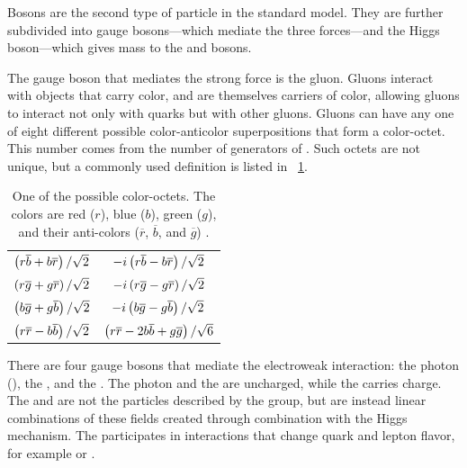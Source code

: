 Bosons are the second type of particle in the standard model. They are further
subdivided into gauge bosons---which mediate the three forces---and the Higgs
boson---which gives mass to the \W and \Z bosons.

The gauge boson that mediates the strong force is the gluon. Gluons interact
with objects that carry color, and are themselves carriers of color, allowing
gluons to interact not only with quarks but with other gluons. Gluons can have
any one of eight different possible color-anticolor superpositions that form a
color-octet. This number comes from the number of generators of \SUthree. Such
octets are not unique, but a commonly used definition is listed in
\TAB~\ref{table:gluon_color}.

\begin{table}[h]
\centering
{}
\begin{center}
    \begin{tabular}{c  c}
        $\left( r \overline{b} + b \overline{r} \right) / \sqrt{2}$ &
        $-i \left( r \overline{b} - b \overline{r} \right) / \sqrt{2}$ \\
        $\left( r \overline{g} + g \overline{r} \right) / \sqrt{2}$ &
        $-i \left( r \overline{g} - g \overline{r} \right) / \sqrt{2}$ \\
        $\left( b \overline{g} + g \overline{b} \right) / \sqrt{2}$ &
        $-i \left( b \overline{g} - g \overline{b} \right) / \sqrt{2}$ \\
        $\left( r \overline{r} - b \overline{b} \right) / \sqrt{2}$ &
        $\left( r \overline{r} - 2b \overline{b} + g \overline{g} \right) / \sqrt{6}$ \\
    \end{tabular}
    \caption[
        One possible QCD color-octet.
    ]{
        One of the possible color-octets. The colors are red ($r$), blue ($b$),
        green ($g$), and their anti-colors ($\overline{r}$, $\overline{b}$, and
        $\overline{g}$) .
    }
\label{table:gluon_color}
\end{center}
\end{table}

There are four gauge bosons that mediate the electroweak interaction: the photon
(\photon), the \Z, and the \Wpm. The photon and the \Z are uncharged, while the
\Wpm carries charge. The \W and \Z are not the particles described by the
\SUtwoUone group, but are instead linear combinations of these fields created
through combination with the Higgs mechanism. The \W participates in
interactions that change quark and lepton flavor, for example \ttoWb or
\mutoWnu.

